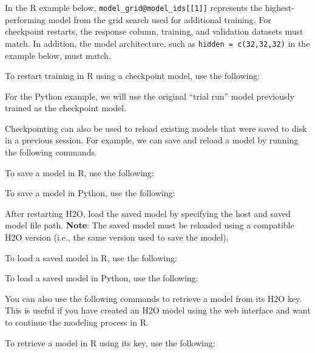 {{In the R example below, \texttt{model\_grid@model\_ids[[1]]} represents the highest-performing model from the grid search used for additional training. For checkpoint restarts, the response column, training, and validation datasets must match.  In addition, the model architecture, such as \texttt{hidden = c(32,32,32)} in the example below, must match.

\waterExampleInR
To restart training in R using a checkpoint model, use the following: 


\medskip
\waterExampleInPython
For the Python example, we will use the original ``trial run'' model previously trained as the checkpoint model.
\medskip


\noindent
Checkpointing can also be used to reload existing models that were saved to disk in a previous session. For example, we can save and reload a model by running the following commands.

\waterExampleInR
To save a model in R, use the following: 
\medskip

\medskip
\waterExampleInPython
To save a model in Python, use the following: 
\medskip



\normalsize

\noindent
After restarting  H2O, load the saved model by specifying the host and saved model file path. \textbf{Note}: The saved model must be reloaded using a compatible H2O version (i.e., the same version used to save the model).

\normalsize
\waterExampleInR
To load a saved model in R, use the following: 


\waterExampleInPython
To load a saved model in Python, use the following: 



\noindent
You can also use the following commands to retrieve a model from its H2O key. This is useful if you have created an H2O model using the web interface and want to continue the modeling process in R.

\waterExampleInR
To retrieve a model in R using its key, use the following: 


}}
